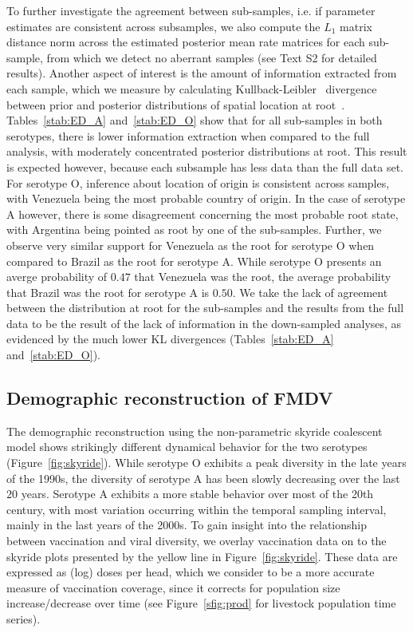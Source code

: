 \documentclass[10pt]{article}
\begin{document}
To further investigate the agreement between sub-samples, i.e. if parameter estimates are consistent across subsamples, we also compute the $L_1$ matrix distance norm across the estimated posterior mean rate matrices for each sub-sample, from which we detect no aberrant samples (see Text S2 for detailed results).
Another aspect of interest is the amount of information extracted from each sample, which we measure by calculating Kullback-Leibler~\cite{KL} divergence between prior and posterior distributions of spatial location at root~\cite{roots}.
Tables~\ref{stab:ED_A} and~\ref{stab:ED_O} show that for all sub-samples in both serotypes, there is lower information extraction when compared to the full analysis, with moderately concentrated posterior distributions at root.
This result is expected however, because each subsample has less data than the full data set.
For serotype O, inference about location of origin is consistent across samples, with Venezuela being the most probable country of origin.
In the case of serotype A however, there is some disagreement concerning the most probable root state, with Argentina being pointed as root by one of the sub-samples.
Further, we observe very similar support for Venezuela as the root for serotype O when compared to Brazil as the root for serotype A.
While serotype O presents an averge probability of $0.47$ that Venezuela was the root, the average probability that Brazil was the root for serotype A is $0.50$.
We take the lack of agreement between the distribution at root for the sub-samples and the results from the full data to be the result of the lack of information in the down-sampled analyses, as evidenced by the much lower KL divergences (Tables~\ref{stab:ED_A} and~\ref{stab:ED_O}). 

\subsection*{Demographic reconstruction of FMDV}

The demographic reconstruction using the non-parametric skyride coalescent model shows strikingly different dynamical behavior for the two serotypes (Figure~\ref{fig:skyride}).
While serotype O exhibits a peak diversity in the late years of the 1990s, the diversity of serotype A has been slowly decreasing over the last $20$ years.
Serotype A exhibits a more stable behavior over most of the 20th century, with most variation occurring within the temporal sampling interval, mainly in the last years of the 2000s.
To gain insight into the relationship between vaccination and viral diversity, we overlay vaccination data on to the skyride plots presented by the yellow line in Figure~\ref{fig:skyride}.
These data are expressed as (log) doses per head, which we consider to be a more accurate measure of vaccination coverage, since it corrects for population size increase/decrease over time (see Figure~\ref{sfig:prod} for livestock population time series). 
\end{document}

